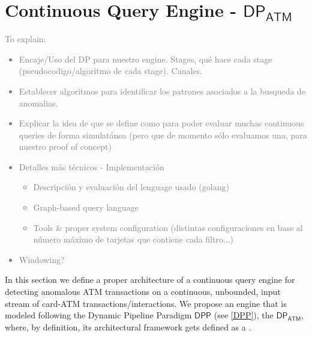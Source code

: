 \newpage
\section{Continuous Query Engine - $\mathsf{DP_{ATM}}$}\label{ContinuousQueryEngine}

\textcolor{gray}{To explain:
\begin{itemize}
    \item Encaje/Uso del DP para nuestro engine. Stages, qué hace cada stage (pseudocodigo/algoritmo de cada stage). Canales.
    \item Establecer algoritmos para identificar los patrones asociados a la busqueda de anomalias.
    \item Explicar la idea de que se define como para poder evaluar muchas continuous queries de forma simulatánea (pero que de momento sólo evaluamos una, para nuestro proof of concept)
    \item Detalles más técnicos - Implementación
    \begin{itemize}
        \item Descripción y evaluación del lenguage usado (golang)
        \item Graph-based query language
        \item Tools \& proper system configuration (distintas configuraciones en base al número máximo de tarjetas que contiene cada filtro...)
    \end{itemize}
    \item Windowing?
\end{itemize}
}

In this section we define a proper architecture of a continuous query engine for detecting anomalous ATM transactions on a continuous, unbounded, input stream of card-ATM transactions/interactions. We propose an engine that is modeled following the Dynamic Pipeline Paradigm $\mathsf{DPP}$ (see \ref{DPP}), the $\mathsf{DP_{ATM}}$, where, by definition, its architectural framework gets defined as a \DP.\\ 


